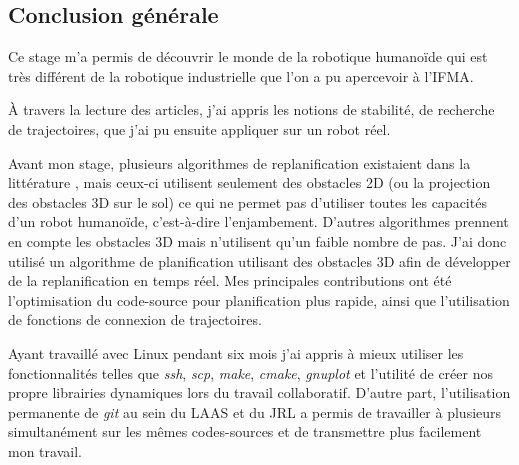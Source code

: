\subsection{Conclusion générale}
\label{sub:conclusion}

Ce stage m'a permis de découvrir le monde de la robotique humanoïde qui est très différent de la robotique industrielle que l'on a pu apercevoir à l'IFMA. 

\`A travers la lecture des articles, j'ai appris les notions de stabilité, de recherche de trajectoires, que j'ai pu ensuite appliquer sur un robot réel. 

Avant mon stage, plusieurs algorithmes de replanification existaient dans la littérature \cite{Chestnutt:ICRA:2005}, mais ceux-ci utilisent seulement des obstacles 2D (ou la projection des obstacles 3D sur le sol) ce qui ne permet pas d'utiliser toutes les capacités d'un robot humanoïde, c'est-à-dire l'enjambement. D'autres algorithmes \cite{Kuffner03} prennent en compte les obstacles 3D mais n'utilisent qu'un faible nombre de pas. 
J'ai donc utilisé un algorithme de planification utilisant des obstacles 3D \cite{baudouin:humanoids:11} afin de développer de la replanification en temps réel.
Mes principales contributions ont été l'optimisation du code-source pour planification plus rapide, ainsi que l'utilisation de fonctions de connexion de trajectoires.

Ayant travaillé avec Linux pendant six mois j'ai appris à mieux utiliser les fonctionnalités telles que \emph{ssh}, \emph{scp}, \emph{make}, \emph{cmake}, \emph{gnuplot} et l'utilité de créer nos propre librairies dynamiques lors du travail collaboratif. D'autre part, l'utilisation permanente de \emph{git} au sein du LAAS et du JRL a permis de travailler à plusieurs simultanément sur les mêmes codes-sources et de transmettre plus facilement mon travail.
